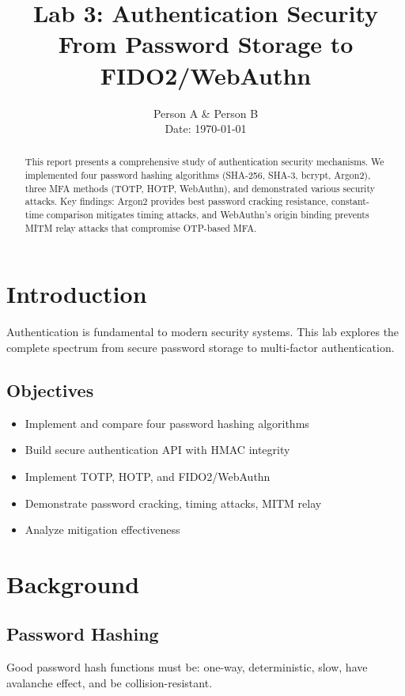 \documentclass[12pt,a4paper]{article}
\title{\textbf{Lab 3: Authentication Security\\From Password Storage to FIDO2/WebAuthn}}
\author{Person A \& Person B\\Date: \today}
\begin{document}
\maketitle

\begin{abstract}
This report presents a comprehensive study of authentication security mechanisms. We implemented four password hashing algorithms (SHA-256, SHA-3, bcrypt, Argon2), three MFA methods (TOTP, HOTP, WebAuthn), and demonstrated various security attacks. Key findings: Argon2 provides best password cracking resistance, constant-time comparison mitigates timing attacks, and WebAuthn's origin binding prevents MITM relay attacks that compromise OTP-based MFA.
\end{abstract}

\newpage
\tableofcontents
\newpage

\section{Introduction}
Authentication is fundamental to modern security systems. This lab explores the complete spectrum from secure password storage to multi-factor authentication.

\subsection{Objectives}
\begin{itemize}
\item Implement and compare four password hashing algorithms
\item Build secure authentication API with HMAC integrity
\item Implement TOTP, HOTP, and FIDO2/WebAuthn
\item Demonstrate password cracking, timing attacks, MITM relay
\item Analyze mitigation effectiveness
\end{itemize}

\section{Background}

\subsection{Password Hashing}
Good password hash functions must be: one-way, deterministic, slow, have avalanche effect, and be collision-resistant.
\end{document}
